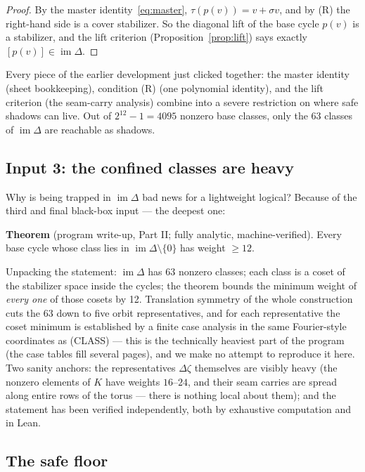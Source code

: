 \documentclass[11pt]{article}
\theoremstyle{plain}
\theoremstyle{definition}
\theoremstyle{remark}
\newcommand{\imD}{\operatorname{im}\Delta}
\begin{document}
\begin{proof}
By the master identity~\eqref{eq:master}, $\tau(p(v)) = v + \sigma v$, and by
(R) the right-hand side is a cover stabilizer. So the diagonal lift of the
base cycle $p(v)$ is a stabilizer, and the lift criterion
(Proposition~\ref{prop:lift}) says exactly $[p(v)] \in \imD$.
\end{proof}

Every piece of the earlier development just clicked together: the master
identity (sheet bookkeeping), condition (R) (one polynomial identity), and the
lift criterion (the seam-carry analysis) combine into a severe restriction on
where safe shadows can live. Out of $2^{12} - 1 = 4095$ nonzero base classes,
only the $63$ classes of $\imD$ are reachable as shadows.

\subsection{Input 3: the confined classes are heavy}

Why is being trapped in $\imD$ bad news for a lightweight logical? Because of
the third and final black-box input --- the deepest one:

\begin{inputbox}
\textbf{Theorem} (program write-up, Part II; fully analytic, machine-verified).
Every base cycle whose class lies in $\imD \setminus \{0\}$ has weight $\geq
12$.
\end{inputbox}

Unpacking the statement: $\imD$ has $63$ nonzero classes; each class is a
coset of the stabilizer space inside the cycles; the theorem bounds the
minimum weight of \emph{every one} of those cosets by 12. Translation symmetry
of the whole construction cuts the $63$ down to five orbit representatives,
and for each representative the coset minimum is established by a finite
case analysis in the same Fourier-style coordinates as (CLASS) --- this is
the technically heaviest part of the program (the case tables fill several
pages), and we make no attempt to reproduce it here. Two sanity anchors: the
representatives $\Delta\zeta$ themselves are visibly heavy (the nonzero
elements of $K$ have weights $16$--$24$, and their seam carries are spread
along entire rows of the torus --- there is nothing local about them); and the
statement has been verified independently, both by exhaustive computation and
in Lean.

\subsection{The safe floor}
\end{document}
